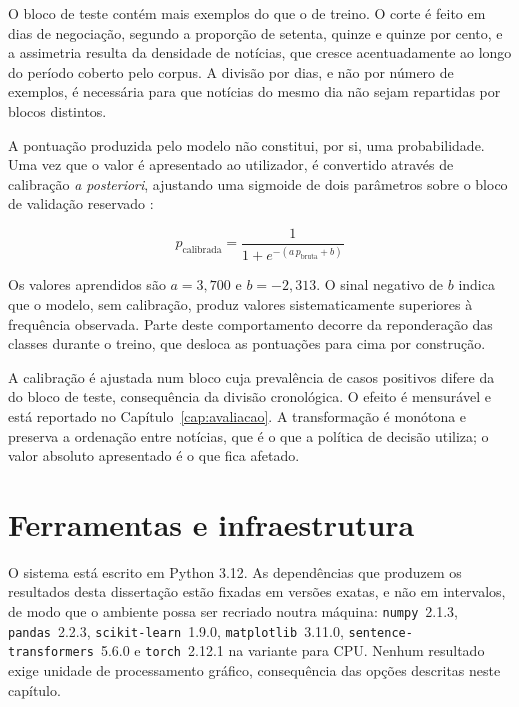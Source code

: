 O bloco de teste contém mais exemplos do que o de treino. O corte é feito em dias de negociação,
segundo a proporção de setenta, quinze e quinze por cento, e a assimetria resulta da densidade de
notícias, que cresce acentuadamente ao longo do período coberto pelo corpus. A divisão por dias, e
não por número de exemplos, é necessária para que notícias do mesmo dia não sejam repartidas por
blocos distintos.

A pontuação produzida pelo modelo não constitui, por si, uma probabilidade. Uma vez que o valor é
apresentado ao utilizador, é convertido através de calibração \emph{a posteriori}, ajustando uma
sigmoide de dois parâmetros sobre o bloco de validação reservado \autocite{niculescu2005calibration}:

\begin{equation}
p_{\text{calibrada}} = \frac{1}{1 + e^{-(a\,p_{\text{bruta}} + b)}}
\label{eq:platt}
\end{equation}

Os valores aprendidos são $a = 3{,}700$ e $b = -2{,}313$. O sinal negativo de $b$ indica que o
modelo, sem calibração, produz valores sistematicamente superiores à frequência observada. Parte
deste comportamento decorre da reponderação das classes durante o treino, que desloca as pontuações
para cima por construção.

A calibração é ajustada num bloco cuja prevalência de casos positivos difere da do bloco de teste,
consequência da divisão cronológica. O efeito é mensurável e está reportado no
Capítulo~\ref{cap:avaliacao}. A transformação é monótona e preserva a ordenação entre notícias, que
é o que a política de decisão utiliza; o valor absoluto apresentado é o que fica afetado.

\section{Ferramentas e infraestrutura}
\label{sec:met_ferramentas}

O sistema está escrito em Python 3.12. As dependências que produzem os resultados desta dissertação
estão fixadas em versões exatas, e não em intervalos, de modo que o ambiente possa ser recriado
noutra máquina: \texttt{numpy}~2.1.3, \texttt{pandas}~2.2.3, \texttt{scikit-learn}~1.9.0,
\texttt{matplotlib}~3.11.0, \texttt{sentence-transformers}~5.6.0 e \texttt{torch}~2.12.1 na variante
para CPU. Nenhum resultado exige unidade de processamento gráfico, consequência das opções
descritas neste capítulo.

